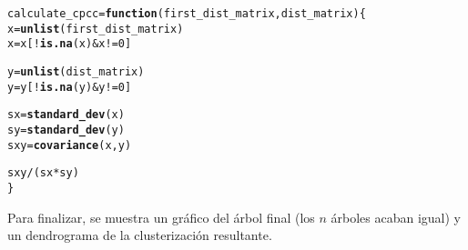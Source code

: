 \documentclass[12pt]{report}\usepackage[]{graphicx}\usepackage[dvipsnames]{xcolor}
\makeatletter
\newcommand{\hlnum}[1]{\textcolor[rgb]{0.686,0.059,0.569}{#1}}%
\newcommand{\hlopt}[1]{\textcolor[rgb]{0,0,0}{#1}}%
\newcommand{\hlstd}[1]{\textcolor[rgb]{0.345,0.345,0.345}{#1}}%
\newcommand{\hlkwa}[1]{\textcolor[rgb]{0.161,0.373,0.58}{\textbf{#1}}}%
\newcommand{\hlkwb}[1]{\textcolor[rgb]{0.69,0.353,0.396}{#1}}%
\newcommand{\hlkwc}[1]{\textcolor[rgb]{0.333,0.667,0.333}{#1}}%
\newcommand{\hlkwd}[1]{\textcolor[rgb]{0.737,0.353,0.396}{\textbf{#1}}}%
\newenvironment{kframe}{%
 \def\at@end@of@kframe{}%
 \ifinner\ifhmode%
  \def\at@end@of@kframe{\end{minipage}}%
  \begin{minipage}{\columnwidth}%
 \fi\fi%
 \def\FrameCommand##1{\hskip\@totalleftmargin \hskip-\fboxsep
 \colorbox{shadecolor}{##1}\hskip-\fboxsep
     \hskip-\linewidth \hskip-\@totalleftmargin \hskip\columnwidth}%
 \MakeFramed {\advance\hsize-\width
   \@totalleftmargin\z@ \linewidth\hsize
   \@setminipage}}%
 {\par\unskip\endMakeFramed%
 \at@end@of@kframe}
\newenvironment{knitrout}{}{} %
\makeatother
\begin{document}
\begin{knitrout}
\color{fgcolor}\begin{kframe}
\begin{alltt}
\hlstd{calculate_cpcc} \hlkwb{=} \hlkwa{function}\hlstd{(}\hlkwc{first_dist_matrix}\hlstd{,} \hlkwc{dist_matrix}\hlstd{) \{}
        \hlstd{x} \hlkwb{=} \hlkwd{unlist}\hlstd{(first_dist_matrix)}
        \hlstd{x} \hlkwb{=} \hlstd{x[}\hlopt{!}\hlkwd{is.na}\hlstd{(x)} \hlopt{&} \hlstd{x} \hlopt{!=} \hlnum{0}\hlstd{]}

        \hlstd{y} \hlkwb{=} \hlkwd{unlist}\hlstd{(dist_matrix)}
        \hlstd{y} \hlkwb{=} \hlstd{y[}\hlopt{!}\hlkwd{is.na}\hlstd{(y)} \hlopt{&} \hlstd{y} \hlopt{!=} \hlnum{0}\hlstd{]}

        \hlstd{sx} \hlkwb{=} \hlkwd{standard_dev}\hlstd{(x)}
        \hlstd{sy} \hlkwb{=} \hlkwd{standard_dev}\hlstd{(y)}
        \hlstd{sxy} \hlkwb{=} \hlkwd{covariance}\hlstd{(x, y)}

        \hlstd{sxy} \hlopt{/} \hlstd{(sx} \hlopt{*} \hlstd{sy)}
\hlstd{\}}
\end{alltt}
\end{kframe}
\end{knitrout}
		 		
		 		Para finalizar, se muestra un gráfico del árbol final (los $n$ árboles acaban igual) y un dendrograma de la clusterización resultante. 
		 		
\end{document}
